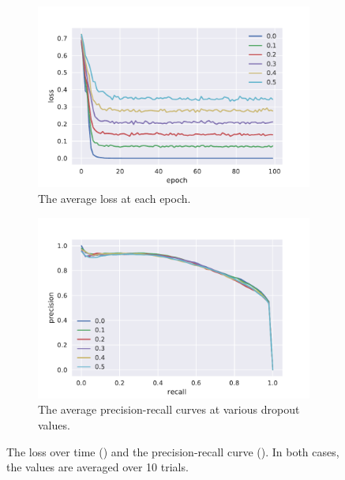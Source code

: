 \begin{figure}[htbp]
  \centering
  \begin{subfigure}[t]{0.49\textwidth}
    \centering
    \includegraphics[width=\textwidth]{./figures/results/dropout/losses.pdf}
    \caption{The average loss at each epoch.\\}%
    \label{fig:dropout_loss}
  \end{subfigure}
  \begin{subfigure}[t]{0.49\textwidth}
    \centering
    \includegraphics[width=\textwidth]{./figures/results/dropout/pr.pdf}
    \caption{The average precision-recall curves at various dropout values.}%
    \label{fig:dropout_pr}
  \end{subfigure}
  \caption{The loss over time () and the
    precision-recall curve (). In both cases, the values are
    averaged over 10 trials.}%
    \label{fig:dropout_plots}
\end{figure}

